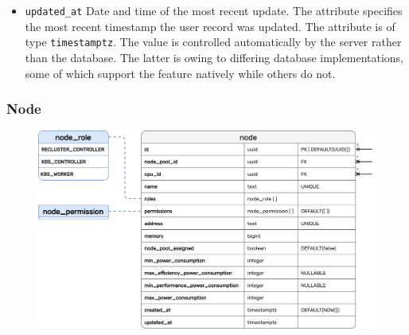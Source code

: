 \begin{itemize}
  \item \texttt{updated\_at}
    \newline
    Date and time of the most recent update.
    \newline
    The attribute specifies the most recent timestamp the user record was updated.
    \newline
    The attribute is of type \texttt{timestamptz}.
    \newline
    The value is controlled automatically by the server rather than the database.
    The latter is owing to differing database implementations, some of which
    support the feature natively while others do not.
\end{itemize}

\pagebreak


\subsubsection{Node}
\label{subsubsec:implementation_server_database_node}

\begin{figure}
  \centering
  \includegraphics[width=\linewidth]{images/implementation/erm_node.png}
\end{figure}

